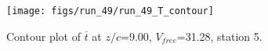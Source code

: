 \begin{figure}[H]
\centering
\texttt{[image: figs/run\_49/run\_49\_T\_contour]}
\caption{Contour plot of $\overline{t}$ at $z/c$=9.00, $V_{free}$=31.28, station 5.}
\end{figure}


